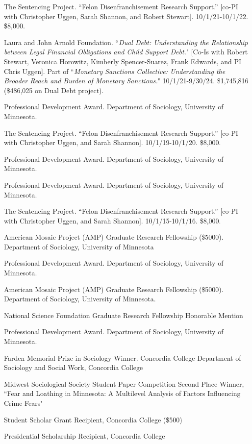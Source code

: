 \documentclass[letterpaper]{article}
\newenvironment{publist}{%
  \begin{list}{}{%
    \setlength{\leftmargin}{0cm}   %
    \setlength{\labelwidth}{2cm}     %
    \setlength{\labelsep}{0.5cm}     %
  }%
}{%
  \end{list}%
}
\begin{document}
\begin{publist}
\item[\textbf{2022}]The Sentencing Project. “Felon Disenfranchisement Research Support.” [co-PI with Christopher Uggen, Sarah Shannon, and Robert Stewart]. 10/1/21-10/1/22. \$8,000.

\item[\textbf{2021-2024}]  Laura and John Arnold Foundation. ``\textit{Dual Debt: Understanding the Relationship between Legal Financial Obligations and Child Support Debt.}" [Co-Is with Robert Stewart, Veronica Horowitz, Kimberly Spencer-Suarez, Frank Edwards, and PI Chris Uggen]. Part of ``\textit{Monetary Sanctions Collective: Understanding the Broader Reach and Burden of Monetary Sanctions.}" 10/1/21-9/30/24. \$1,745,816 (\$486,025 on Dual Debt project).

\item[\textbf{2021}] Professional Development Award. Department of Sociology, University of Minnesota. 

\item[\textbf{2020}] The Sentencing Project. “Felon Disenfranchisement Research Support.” [co-PI with Christopher Uggen, and Sarah Shannon]. 10/1/19-10/1/20. \$8,000.

\item[\textbf{2018}] Professional Development Award. Department of Sociology, University of Minnesota. 
\item[\textbf{2017}] Professional Development Award. Department of Sociology, University of Minnesota. 
\item[\textbf{2016}] The Sentencing Project. “Felon Disenfranchisement Research Support.” [co-PI with Christopher Uggen, and Sarah Shannon]. 10/1/15-10/1/16. \$8,000.
\item American Mosaic Project (AMP) Graduate Research Fellowship (\$5000). Department of Sociology, University of Minnesota
\item Professional Development Award. Department of Sociology, University of Minnesota. 
\item[\textbf{2015}] American Mosaic Project (AMP) Graduate Research Fellowship (\$5000). Department of Sociology, University of Minnesota. 
\item National Science Foundation Graduate Research Fellowship Honorable Mention
\item Professional Development Award. Department of Sociology, University of Minnesota. 
\item[\textbf{2014}]Farden Memorial Prize in Sociology Winner. Concordia College Department of Sociology and Social Work, Concordia College
\item Midwest Sociological Society Student Paper Competition Second Place Winner,  ``Fear and Loathing in Minnesota: A Multilevel Analysis of Factors Influencing Crime Fears"
\item[\textbf{2013}] Student Scholar Grant Recipient, Concordia College (\$500)
\item[\textbf{2010}] Presidential Scholarship Recipient, Concordia College

\end{publist}
\end{document}
